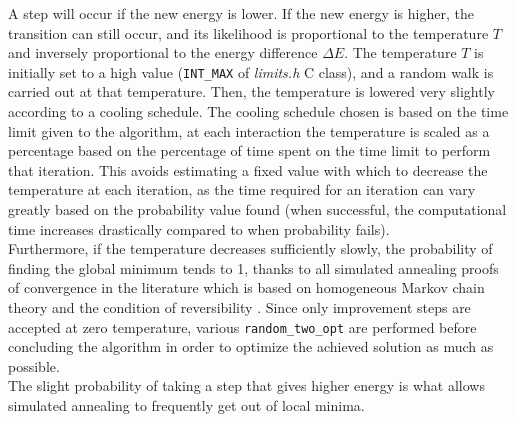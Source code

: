 A step will occur if the new energy is lower. If the new energy is higher, the transition can still occur, and its likelihood is proportional to the temperature $T$ and inversely proportional to the energy difference $\Delta E$.
The temperature $T$ is initially set to a high value (\texttt{INT\_MAX} of \textit{limits.h} C class), and a random walk is carried out at that temperature. Then, the temperature is lowered very slightly according to a cooling schedule.
The cooling schedule chosen is based on the time limit given to the algorithm, at each interaction the temperature is scaled as a percentage based on the percentage of time spent on the time limit to perform that iteration. This avoids estimating a fixed value with which to decrease the temperature at each iteration, as the time required for an iteration can vary greatly based on the probability value found (when successful, the computational time increases drastically compared to when probability fails).\\
Furthermore, if the temperature decreases sufficiently slowly, the probability of finding the global minimum tends to 1, thanks to all simulated annealing proofs of convergence in the literature which is based on homogeneous Markov chain theory and the condition of reversibility \cite{Henderson}. Since only improvement steps are accepted at zero temperature, various \texttt{random\_two\_opt} are performed before concluding the algorithm in order to optimize the achieved solution as much as possible.\\
The slight probability of taking a step that gives higher energy is what allows simulated annealing to frequently get out of local minima.

